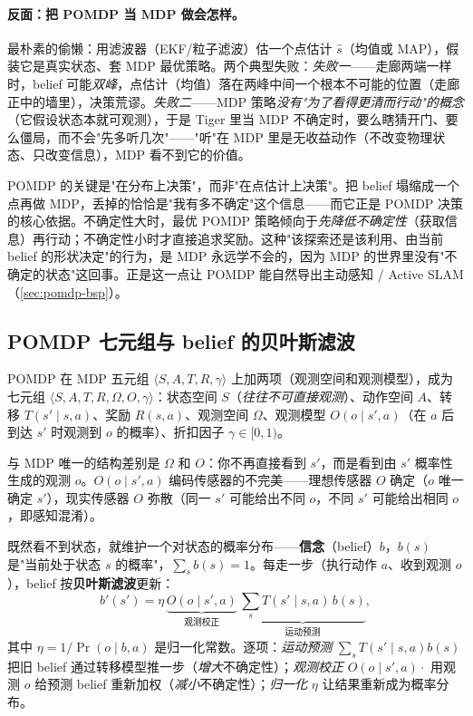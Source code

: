 \paragraph{反面：把 POMDP 当 MDP 做会怎样。}
最朴素的偷懒：用滤波器（EKF/粒子滤波）估一个点估计 $\hat s$（均值或 MAP），假装它是真实状态、套 MDP 最优策略。两个典型失败：\emph{失败一}——走廊两端一样时，belief 可能\emph{双峰}，点估计（均值）落在两峰中间一个根本不可能的位置（走廊正中的墙里），决策荒谬。\emph{失败二}——MDP 策略\emph{没有"为了看得更清而行动"的概念}（它假设状态本就可观测），于是 Tiger 里当 MDP 不确定时，要么瞎猜开门、要么僵局，而不会"先多听几次"——"听"在 MDP 里是无收益动作（不改变物理状态、只改变信息），MDP 看不到它的价值。

\begin{insight}
POMDP 的关键是"在分布上决策"，而非"在点估计上决策"。把 belief 塌缩成一个点再做 MDP，丢掉的恰恰是"我有多不确定"这个信息——而它正是 POMDP 决策的核心依据。不确定性大时，最优 POMDP 策略倾向于\emph{先降低不确定性}（获取信息）再行动；不确定性小时才直接追求奖励。这种"该探索还是该利用、由当前 belief 的形状决定"的行为，是 MDP 永远学不会的，因为 MDP 的世界里没有"不确定的状态"这回事。正是这一点让 POMDP 能自然导出主动感知 / Active SLAM（\cref{sec:pomdp-bsp}）。
\end{insight}

\subsection{POMDP 七元组与 belief 的贝叶斯滤波}
\label{sec:pomdp-seven}

\begin{definition}\label{def:pomdp-seven}
POMDP 在 MDP 五元组 $\langle S,A,T,R,\gamma\rangle$ 上加两项（观测空间和观测模型），成为七元组 $\langle S,A,T,R,\Omega,O,\gamma\rangle$：状态空间 $S$（\emph{往往不可直接观测}）、动作空间 $A$、转移 $T(s'\mid s,a)$、奖励 $R(s,a)$、观测空间 $\Omega$、观测模型 $O(o\mid s',a)$（在 $a$ 后到达 $s'$ 时观测到 $o$ 的概率）、折扣因子 $\gamma\in[0,1)$。
\end{definition}

与 MDP 唯一的结构差别是 $\Omega$ 和 $O$：你不再直接看到 $s'$，而是看到由 $s'$ 概率性生成的观测 $o$。$O(o\mid s',a)$ 编码传感器的不完美——理想传感器 $O$ 确定（$o$ 唯一确定 $s'$），现实传感器 $O$ 弥散（同一 $s'$ 可能给出不同 $o$，不同 $s'$ 可能给出相同 $o$，即感知混淆）。

既然看不到状态，就维护一个对状态的概率分布——\textbf{信念}（belief）$b$，$b(s)$ 是"当前处于状态 $s$ 的概率"，$\sum_s b(s)=1$。每走一步（执行动作 $a$、收到观测 $o$），belief 按\textbf{贝叶斯滤波}更新：
\begin{equation}
  b'(s')=\eta\,\underbrace{O(o\mid s',a)}_{\text{观测校正}}\,\underbrace{\sum_{s}T(s'\mid s,a)\,b(s)}_{\text{运动预测}},
  \label{eq:pomdp-belief-update}
\end{equation}
其中 $\eta=1/\Pr(o\mid b,a)$ 是归一化常数。逐项：\emph{运动预测} $\sum_s T(s'\mid s,a)b(s)$ 把旧 belief 通过转移模型推一步（\emph{增大}不确定性）；\emph{观测校正} $O(o\mid s',a)\cdot$ 用观测 $o$ 给预测 belief 重新加权（\emph{减小}不确定性）；\emph{归一化} $\eta$ 让结果重新成为概率分布。

